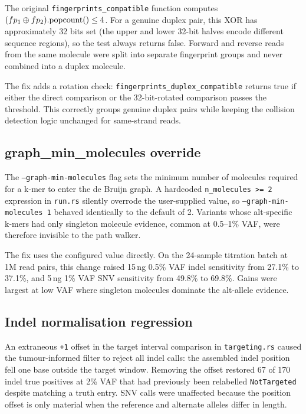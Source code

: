 The original \texttt{fingerprints\_compatible} function computes
$(fp_1 \oplus fp_2).{\rm popcount()} \le 4$.
For a genuine duplex pair, this XOR has approximately 32 bits set (the upper
and lower 32-bit halves encode different sequence regions), so the test always
returns false.
Forward and reverse reads from the same molecule were split into separate
fingerprint groups and never combined into a duplex molecule.

The fix adds a rotation check:
\texttt{fingerprints\_duplex\_compatible} returns true if either the direct
comparison or the 32-bit-rotated comparison passes the threshold.
This correctly groups genuine duplex pairs while keeping the collision detection
logic unchanged for same-strand reads.

\subsection{graph\_min\_molecules override}
\label{sec:eval:gmin}

The \texttt{--graph-min-molecules} flag sets the minimum number of molecules
required for a k-mer to enter the de Bruijn graph. A hardcoded
\texttt{n\_molecules >= 2} expression in \texttt{run.rs} silently overrode the
user-supplied value, so \texttt{--graph-min-molecules 1} behaved identically to
the default of 2. Variants whose alt-specific k-mers had only singleton
molecule evidence, common at 0.5--1\% VAF, were therefore invisible to the
path walker.

The fix uses the configured value directly. On the 24-sample titration batch
at 1M read pairs, this change raised 15\,ng 0.5\% VAF indel sensitivity from
27.1\% to 37.1\%, and 5\,ng 1\% VAF SNV sensitivity from 49.8\% to 69.8\%.
Gains were largest at low VAF where singleton molecules dominate the alt-allele
evidence.

\subsection{Indel normalisation regression}
\label{sec:eval:indelnorm}

An extraneous \texttt{+1} offset in the target interval comparison in
\texttt{targeting.rs} caused the tumour-informed filter to reject all indel
calls: the assembled indel position fell one base outside the target window.
Removing the offset restored 67 of 170 indel true positives at 2\% VAF that
had previously been relabelled \texttt{NotTargeted} despite matching a truth
entry.
SNV calls were unaffected because the position offset is only material when
the reference and alternate alleles differ in length.

